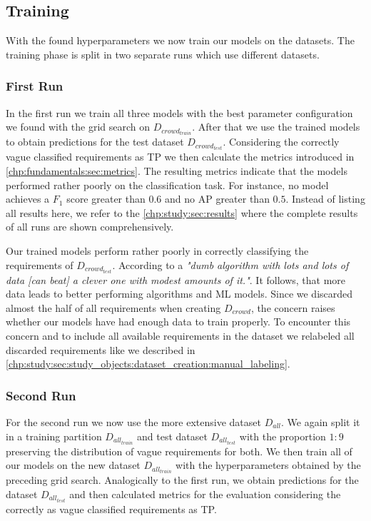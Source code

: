 \subsection{Training}
\label{chp:study:sec:execution:subsec:training}
With the found hyperparameters we now train our models on the datasets.
The training phase is split in two separate runs which use different datasets.

\subsubsection{First Run}
\label{chp:study:sec:execution:subsec:training:first_run}
In the first run we train all three models with the best parameter configuration we found with the grid search on $D_{crowd_{train}}$.
After that we use the trained models to obtain predictions for the test dataset $D_{crowd_{test}}$.
Considering the correctly vague classified requirements as \ac{TP} we then calculate the metrics introduced in \cref{chp:fundamentals:sec:metrics}.
The resulting metrics indicate that the models performed rather poorly on the classification task.
For instance, no model achieves a $F_1$ score greater than $0.6$ and no \ac{AP} greater than $0.5$. %
Instead of listing all results here, we refer to the \cref{chp:study:sec:results} where the complete results of all runs are shown comprehensively.

Our trained models perform rather poorly in correctly classifying the requirements of $D_{crowd_{test}}$.
According to \textcite{Domingos:2012} a \textit{"dumb algorithm with lots and lots of data [can beat] a clever one with modest amounts of it."}.
It follows, that more data leads to better performing algorithms and \ac{ML} models.
Since we discarded almost the half of all requirements when creating $D_{crowd}$, the concern raises whether our models have had enough data to train properly.
To encounter this concern and to include all available requirements in the dataset we relabeled all discarded requirements like we described in \cref{chp:study:sec:study_objects:dataset_creation:manual_labeling}.

\subsubsection{Second Run}
\label{chp:study:sec:execution:subsec:training:second_run}

For the second run we now use the more extensive dataset $D_{all}$.
We again split it in a training partition $D_{all_{train}}$ and test dataset $D_{all_{test}}$ with the proportion $1\mathrm{:}9$ preserving the distribution of vague requirements for both.
We then train all of our models on the new dataset $D_{all_{train}}$ with the hyperparameters obtained by the preceding grid search.
Analogically to the first run, we obtain predictions for the dataset $D_{all_{test}}$ and then calculated metrics for the evaluation considering the correctly as vague classified requirements as \ac{TP}.
